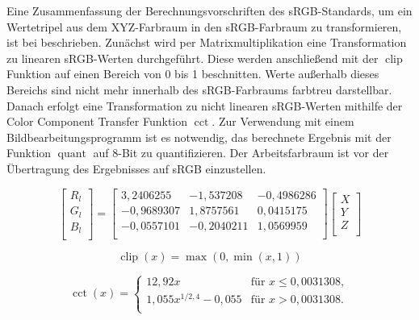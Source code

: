\documentclass[10pt,a4paper,DIV=12,parskip=half]{scrarticle}
\begin{document}
Eine Zusammenfassung der Berechnungsvorschriften des sRGB-Standards, um ein Wertetripel aus dem XYZ-Farbraum in den sRGB-Farbraum zu transformieren, ist bei \textcite{W3C2015} beschrieben. Zunächst wird per Matrixmultiplikation eine Transformation zu linearen sRGB-Werten durchgeführt. Diese werden anschließend mit der $\operatorname{clip}$ Funktion auf einen Bereich von 0 bis 1 beschnitten. Werte außerhalb dieses Bereichs sind nicht mehr innerhalb des sRGB-Farbraums farbtreu darstellbar. Danach erfolgt eine Transformation zu nicht linearen sRGB-Werten mithilfe der Color Component Transfer Funktion $\operatorname{cct}$. Zur Verwendung mit einem Bildbearbeitungsprogramm ist es notwendig, das berechnete Ergebnis mit der Funktion $\operatorname{quant}$ auf 8-Bit zu quantifizieren. Der Arbeitsfarbraum ist vor der Übertragung des Ergebnisses auf sRGB einzustellen.

\begin{equation*}
\begin{bmatrix}
R_{l} \\
G_{l} \\
B_{l} \\
\end{bmatrix} =
\begin{bmatrix}
3,2406255 & -1,537208 & -0,4986286 \\
-0,9689307 & 1,8757561 & 0,0415175 \\
-0,0557101 & -0,2040211 & 1,0569959 \\
\end{bmatrix}
\begin{bmatrix}
X \\
Y \\
Z \\
\end{bmatrix}
\end{equation*}

\begin{equation*}
\operatorname{clip}(x)=\operatorname{max}(0, \operatorname{min}(x, 1))
\end{equation*}

\begin{equation*}
\operatorname{cct}(x)=
\begin{cases}
12,92 x & \text{für } x \leq 0,0031308, \\
1,055 x^{1/2,4} - 0,055 & \text{für } x > 0,0031308. \\
\end{cases}
\end{equation*}
\end{document}
